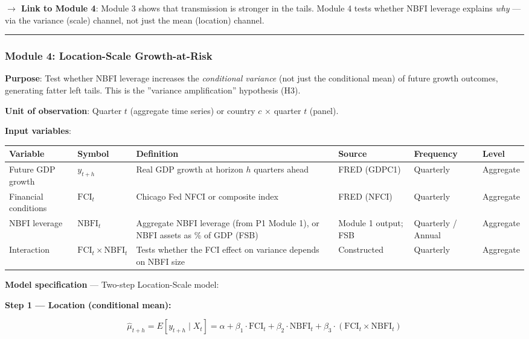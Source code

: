\documentclass[11pt,a4paper]{article}
\begin{document}
\textbf{$\rightarrow$ Link to Module 4}: Module 3 shows that transmission is stronger in the tails. Module 4 tests whether NBFI leverage explains \textit{why} --- via the variance (scale) channel, not just the mean (location) channel.


\bigskip\noindent\rule{\textwidth}{0.4pt}\bigskip


\subsubsection{Module 4: Location-Scale Growth-at-Risk}

\textbf{Purpose}: Test whether NBFI leverage increases the \textit{conditional variance} (not just the conditional mean) of future growth outcomes, generating fatter left tails. This is the ''variance amplification'' hypothesis (H3).

\textbf{Unit of observation}: Quarter $t$ (aggregate time series) or country $c$ $\times$ quarter $t$ (panel).

\textbf{Input variables}:


{\small
\begin{longtable}{|p{}|p{}|p{}|p{}|p{}|p{}|}
\hline
\textbf{Variable} & \textbf{Symbol} & \textbf{Definition} & \textbf{Source} & \textbf{Frequency} & \textbf{Level} \\
\hline
\endhead
Future GDP growth & $y_{t+h}$ & Real GDP growth at horizon $h$ quarters ahead & FRED (GDPC1) & Quarterly & Aggregate \\
\hline
Financial conditions & $\text{FCI}_t$ & Chicago Fed NFCI or composite index & FRED (NFCI) & Quarterly & Aggregate \\
\hline
NBFI leverage & $\text{NBFI}_t$ & Aggregate NBFI leverage (from P1 Module 1), or NBFI assets as \% of GDP (FSB) & Module 1 output; FSB & Quarterly / Annual & Aggregate \\
\hline
Interaction & $\text{FCI}_t \times \text{NBFI}_t$ & Tests whether the FCI effect on variance depends on NBFI size & Constructed & Quarterly & Aggregate \\
\hline
\end{longtable}
}

\textbf{Model specification} --- Two-step Location-Scale model:

\textbf{Step 1 --- Location (conditional mean):}

\[\hat{\mu}_{t+h} = E[y_{t+h} \mid X_t] = \alpha + \beta_1 \cdot \text{FCI}_t + \beta_2 \cdot \text{NBFI}_t + \beta_3 \cdot (\text{FCI}_t \times \text{NBFI}_t)\]
\end{document}
